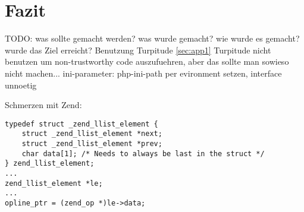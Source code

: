 
\section{Fazit}
\label{sec:chap1:fazit}

TODO:
was sollte gemacht werden? was wurde gemacht? wie wurde es gemacht?
wurde das Ziel erreicht?
Benutzung Turpitude \ref{sec:app1}
Turpitude nicht benutzen um non-trustworthy code auszufuehren, aber das sollte man
sowieso nicht machen...
ini-parameter: php-ini-path per evironment setzen, interface unnoetig

Schmerzen mit Zend:
\begin{lstlisting}[caption=lustiges Beispiel f"ur Zend-Code]
typedef struct _zend_llist_element {
    struct _zend_llist_element *next;
    struct _zend_llist_element *prev;
    char data[1]; /* Needs to always be last in the struct */
} zend_llist_element;
...
zend_llist_element *le;
...
opline_ptr = (zend_op *)le->data;
\end{lstlisting}

